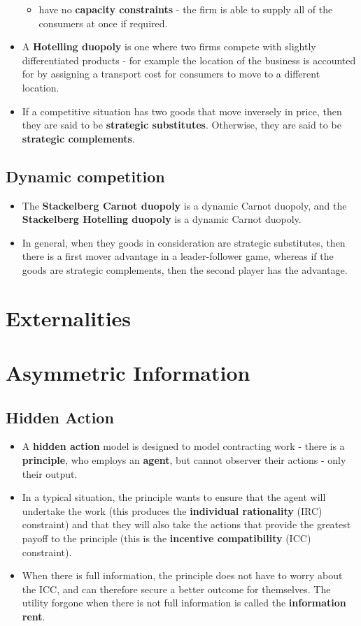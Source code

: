 \documentclass[a4paper]{article}
\begin{document}
\begin{itemize}
\begin{itemize}
        \item have no \textbf{capacity constraints} - the firm is able to supply all of the consumers at once if required.
    \end{itemize}
    \item A \textbf{Hotelling duopoly} is one where two firms compete with slightly differentiated products - for example the location of the business is accounted for by assigning a transport cost for consumers to move to a different location.
    \item If a competitive situation has two goods that move inversely in price, then they are said to be \textbf{strategic substitutes}. Otherwise, they are said to be \textbf{strategic complements}.
\end{itemize}

\subsection{Dynamic competition}
\begin{itemize}
    \item The \textbf{Stackelberg Carnot duopoly} is a dynamic Carnot duopoly, and the \textbf{Stackelberg Hotelling duopoly} is a dynamic Carnot duopoly. 
    \item In general, when they goods in consideration are strategic substitutes, then there is a first mover advantage in a leader-follower game, whereas if the goods are strategic complements, then the second player has the advantage.
\end{itemize}

\section{Externalities}

\section{Asymmetric Information}
\subsection{Hidden Action}
\begin{itemize}
    \item A \textbf{hidden action} model is designed to model contracting work - there is a \textbf{principle}, who employs an \textbf{agent}, but cannot observer their actions - only their output. 
    \item In a typical situation, the principle wants to ensure that the agent will undertake the work (this produces the \textbf{individual rationality} (IRC) constraint) and that they will also take the actions that provide the greatest payoff to the principle (this is the \textbf{incentive compatibility} (ICC) constraint).
    \item When there is full information, the principle does not have to worry about the ICC, and can therefore secure a better outcome for themselves. The utility forgone when there is not full information is called the \textbf{information rent}. 
\end{itemize}
\end{document}
